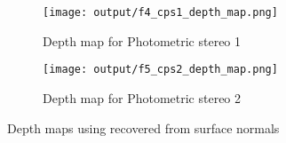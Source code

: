 \documentclass[12pt]{report}
\begin{document}
\begin{enumerate}
    \begin{figure}[H]\centering
        \hspace*{-1.2in}
        \begin{subfigure}{0.40\textwidth}
            \texttt{[image: output/f4\_cps1\_depth\_map.png]}
            \caption{Depth map for Photometric stereo 1}
            \label{fig:Figure4a}
        \end{subfigure}
    \hfil
        \begin{subfigure}{0.40\textwidth}
        \texttt{[image: output/f5\_cps2\_depth\_map.png]}
        \caption{Depth map for Photometric stereo 2}
        \label{fig:Figure4b}
        \end{subfigure}
        \caption{Depth maps using recovered from surface normals}
        \label{fig:Figure4}
    \end{figure}


\end{enumerate}
\end{document}
